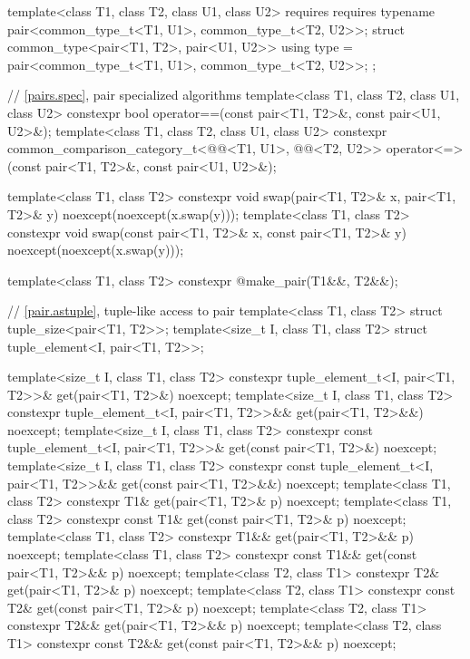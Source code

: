 \begin{codeblock}
{  template<class T1, class T2, class U1, class U2>
    requires requires { typename pair<common_type_t<T1, U1>, common_type_t<T2, U2>>; }
  struct common_type<pair<T1, T2>, pair<U1, U2>> {
    using type = pair<common_type_t<T1, U1>, common_type_t<T2, U2>>;
  };

  // \ref{pairs.spec}, pair specialized algorithms
  template<class T1, class T2, class U1, class U2>
    constexpr bool operator==(const pair<T1, T2>&, const pair<U1, U2>&);
  template<class T1, class T2, class U1, class U2>
    constexpr common_comparison_category_t<@@<T1, U1>,
                                           @@<T2, U2>>
      operator<=>(const pair<T1, T2>&, const pair<U1, U2>&);

  template<class T1, class T2>
    constexpr void swap(pair<T1, T2>& x, pair<T1, T2>& y) noexcept(noexcept(x.swap(y)));
  template<class T1, class T2>
    constexpr void swap(const pair<T1, T2>& x, const pair<T1, T2>& y)
      noexcept(noexcept(x.swap(y)));

  template<class T1, class T2>
    constexpr @\seebelow@ make_pair(T1&&, T2&&);

  // \ref{pair.astuple}, tuple-like access to pair
  template<class T1, class T2> struct tuple_size<pair<T1, T2>>;
  template<size_t I, class T1, class T2> struct tuple_element<I, pair<T1, T2>>;

  template<size_t I, class T1, class T2>
    constexpr tuple_element_t<I, pair<T1, T2>>& get(pair<T1, T2>&) noexcept;
  template<size_t I, class T1, class T2>
    constexpr tuple_element_t<I, pair<T1, T2>>&& get(pair<T1, T2>&&) noexcept;
  template<size_t I, class T1, class T2>
    constexpr const tuple_element_t<I, pair<T1, T2>>& get(const pair<T1, T2>&) noexcept;
  template<size_t I, class T1, class T2>
    constexpr const tuple_element_t<I, pair<T1, T2>>&& get(const pair<T1, T2>&&) noexcept;
  template<class T1, class T2>
    constexpr T1& get(pair<T1, T2>& p) noexcept;
  template<class T1, class T2>
    constexpr const T1& get(const pair<T1, T2>& p) noexcept;
  template<class T1, class T2>
    constexpr T1&& get(pair<T1, T2>&& p) noexcept;
  template<class T1, class T2>
    constexpr const T1&& get(const pair<T1, T2>&& p) noexcept;
  template<class T2, class T1>
    constexpr T2& get(pair<T1, T2>& p) noexcept;
  template<class T2, class T1>
    constexpr const T2& get(const pair<T1, T2>& p) noexcept;
  template<class T2, class T1>
    constexpr T2&& get(pair<T1, T2>&& p) noexcept;
  template<class T2, class T1>
    constexpr const T2&& get(const pair<T1, T2>&& p) noexcept;

}
\end{codeblock}
